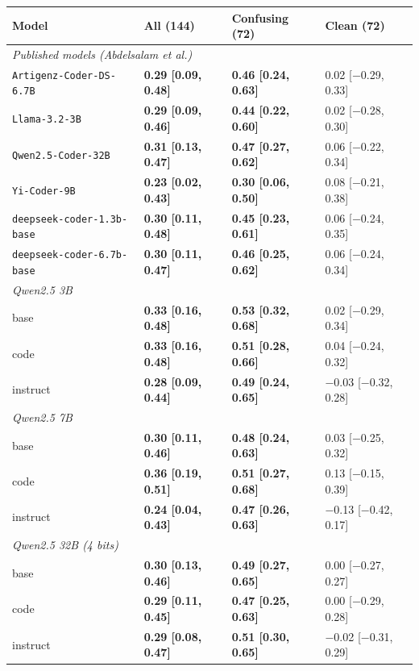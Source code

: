 \begin{tabular}{llll}
\toprule
Model & All (144) & Confusing (72) & Clean (72) \\
\midrule
\multicolumn{4}{l}{\textit{Published models (Abdelsalam et al.)}} \\
\texttt{Artigenz-Coder-DS-6.7B} & \textbf{0.29 [0.09, 0.48]} & \textbf{0.46 [0.24, 0.63]} & 0.02 [$-$0.29, 0.33] \\
\texttt{Llama-3.2-3B} & \textbf{0.29 [0.09, 0.46]} & \textbf{0.44 [0.22, 0.60]} & 0.02 [$-$0.28, 0.30] \\
\texttt{Qwen2.5-Coder-32B} & \textbf{0.31 [0.13, 0.47]} & \textbf{0.47 [0.27, 0.62]} & 0.06 [$-$0.22, 0.34] \\
\texttt{Yi-Coder-9B} & \textbf{0.23 [0.02, 0.43]} & \textbf{0.30 [0.06, 0.50]} & 0.08 [$-$0.21, 0.38] \\
\texttt{deepseek-coder-1.3b-base} & \textbf{0.30 [0.11, 0.48]} & \textbf{0.45 [0.23, 0.61]} & 0.06 [$-$0.24, 0.35] \\
\texttt{deepseek-coder-6.7b-base} & \textbf{0.30 [0.11, 0.47]} & \textbf{0.46 [0.25, 0.62]} & 0.06 [$-$0.24, 0.34] \\
\midrule
\multicolumn{4}{l}{\textit{Qwen2.5 3B}} \\
\quad base & \textbf{0.33 [0.16, 0.48]} & \textbf{0.53 [0.32, 0.68]} & 0.02 [$-$0.29, 0.34] \\
\quad code & \textbf{0.33 [0.16, 0.48]} & \textbf{0.51 [0.28, 0.66]} & 0.04 [$-$0.24, 0.32] \\
\quad instruct & \textbf{0.28 [0.09, 0.44]} & \textbf{0.49 [0.24, 0.65]} & $-$0.03 [$-$0.32, 0.28] \\
\midrule
\multicolumn{4}{l}{\textit{Qwen2.5 7B}} \\
\quad base & \textbf{0.30 [0.11, 0.46]} & \textbf{0.48 [0.24, 0.63]} & 0.03 [$-$0.25, 0.32] \\
\quad code & \textbf{0.36 [0.19, 0.51]} & \textbf{0.51 [0.27, 0.68]} & 0.13 [$-$0.15, 0.39] \\
\quad instruct & \textbf{0.24 [0.04, 0.43]} & \textbf{0.47 [0.26, 0.63]} & $-$0.13 [$-$0.42, 0.17] \\
\midrule
\multicolumn{4}{l}{\textit{Qwen2.5 32B (4 bits)}} \\
\quad base & \textbf{0.30 [0.13, 0.46]} & \textbf{0.49 [0.27, 0.65]} & 0.00 [$-$0.27, 0.27] \\
\quad code & \textbf{0.29 [0.11, 0.45]} & \textbf{0.47 [0.25, 0.63]} & 0.00 [$-$0.29, 0.28] \\
\quad instruct & \textbf{0.29 [0.08, 0.47]} & \textbf{0.51 [0.30, 0.65]} & $-$0.02 [$-$0.31, 0.29] \\

\end{tabular}
